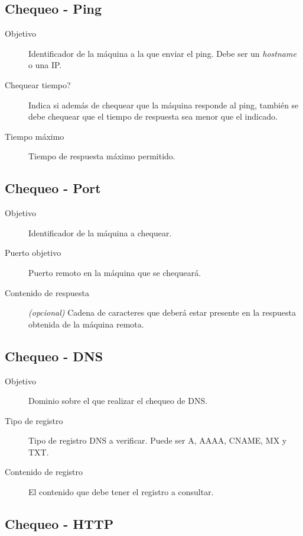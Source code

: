 \subsection{Chequeo - Ping}

\begin{description}
\item[Objetivo] Identificador de la máquina a la que enviar el ping. Debe ser un
  \textit{hostname} o una IP.
\item[Chequear tiempo?] Indica si además de chequear que la máquina responde al
  ping, también se debe chequear que el tiempo de respuesta sea menor que el indicado.
\item[Tiempo máximo] Tiempo de respuesta máximo permitido.
\end{description}

\subsection{Chequeo - Port}

\begin{description}
\item[Objetivo] Identificador de la máquina a chequear.
\item[Puerto objetivo] Puerto remoto en la máquina que se chequeará.
\item[Contenido de respuesta] \textit{(opcional)} Cadena de caracteres que
  deberá estar presente en la respuesta obtenida de la máquina remota.
\end{description}

\subsection{Chequeo - DNS}

\begin{description}
\item[Objetivo] Dominio sobre el que realizar el chequeo de DNS.
\item[Tipo de registro] Tipo de registro DNS a verificar. Puede ser A, AAAA, CNAME, MX y TXT.
\item[Contenido de registro] El contenido que debe tener el registro a consultar.
\end{description}

\subsection{Chequeo - HTTP}

